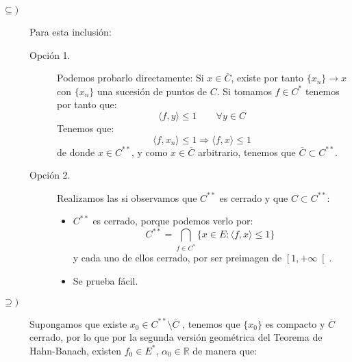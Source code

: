 \begin{ejercicio}
\begin{enumerate}
            \begin{description}
                \item [$\subseteq )$] Para esta inclusión:
                    \begin{description}
                        \item [Opción 1.] Podemos probarlo directamente:
                            Si $x\in \overline{C}$, existe por tanto $\{x_n\}\to x$ con $\{x_n\}$ una sucesión de puntos de $C$. Si tomamos $f\in C^\ast$ tenemos por tanto que:
                            \begin{equation*}
                                \langle f,y \rangle  \leq 1 \qquad \forall y\in C
                            \end{equation*}
                            Tenemos que:
                            \begin{equation*}
                                \langle f,x_n \rangle  \leq 1 \Longrightarrow \langle f,x \rangle \leq 1
                            \end{equation*}
                            de donde $x\in C^{\ast\ast}$, y como $x\in \overline{C}$ arbitrario, tenemos que $\overline{C}\subset C^{\ast\ast}$.
                        \item [Opción 2.] Realizamos las si observamos que $C^{\ast\ast}$ es cerrado y que $C\subset C^{\ast\ast}$: 
                        \begin{itemize}
                            \item $C^{\ast\ast}$ es cerrado, porque podemos verlo por:
                                \begin{equation*}
                                    C^{\ast\ast} = \bigcap_{f\in C^\ast} \{x\in E : \langle f,x \rangle \leq 1 \}
                                \end{equation*}
                                y cada uno de ellos cerrado, por ser preimagen de $\left[1,+\infty\right[$.
                            \item Se prueba fácil.
                        \end{itemize}
                    \end{description}
                \item [$\supseteq)$] Supongamos que existe $x_0\in C^{\ast\ast}\setminus \overline{C}$ , tenemos que $\{x_0\}$ es compacto y $\overline{C}$ cerrado, por lo que por la segunda versión geométrica del Teorema de Hahn-Banach, existen $f_0\in E^\ast$, $\alpha_0\in \mathbb{R}$ de manera que:

\end{description}
\end{enumerate}
\end{ejercicio}

